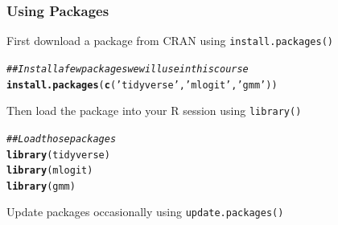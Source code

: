 \documentclass{beamer}\usepackage[]{graphicx}\usepackage[]{color}
\makeatletter
\newcommand{\hlstr}[1]{\textcolor[rgb]{0.192,0.494,0.8}{#1}}%
\newcommand{\hlcom}[1]{\textcolor[rgb]{0.678,0.584,0.686}{\textit{#1}}}%
\newcommand{\hlstd}[1]{\textcolor[rgb]{0.345,0.345,0.345}{#1}}%
\newcommand{\hlkwd}[1]{\textcolor[rgb]{0.737,0.353,0.396}{\textbf{#1}}}%
\newenvironment{kframe}{%
 \def\at@end@of@kframe{}%
 \ifinner\ifhmode%
  \def\at@end@of@kframe{\end{minipage}}%
  \begin{minipage}{\columnwidth}%
 \fi\fi%
 \def\FrameCommand##1{\hskip\@totalleftmargin \hskip-\fboxsep
 \colorbox{shadecolor}{##1}\hskip-\fboxsep
     \hskip-\linewidth \hskip-\@totalleftmargin \hskip\columnwidth}%
 \MakeFramed {\advance\hsize-\width
   \@totalleftmargin\z@ \linewidth\hsize
   \@setminipage}}%
 {\par\unskip\endMakeFramed%
 \at@end@of@kframe}
\newenvironment{knitrout}{}{} %
\makeatother
\begin{document}
\begin{frame}[fragile]\frametitle{Using Packages}
    First download a package from CRAN using \texttt{install.packages()}
\begin{knitrout}\footnotesize
{}\color{fgcolor}\begin{kframe}
\begin{alltt}
\hlcom{## Install a few packages we will use in this course}
\hlkwd{install.packages}\hlstd{(}\hlkwd{c}\hlstd{(}\hlstr{'tidyverse'}\hlstd{,} \hlstr{'mlogit'}\hlstd{,} \hlstr{'gmm'}\hlstd{))}
\end{alltt}
\end{kframe}
\end{knitrout}
    \vspace{3ex}
    Then load the package into your R session using \texttt{library()}
\begin{knitrout}\footnotesize
{}\color{fgcolor}\begin{kframe}
\begin{alltt}
\hlcom{## Load those packages}
\hlkwd{library}\hlstd{(tidyverse)}
\hlkwd{library}\hlstd{(mlogit)}
\hlkwd{library}\hlstd{(gmm)}
\end{alltt}
\end{kframe}
\end{knitrout}
    \vspace{3ex}
    Update packages occasionally using \texttt{update.packages()}
\end{frame}
\end{document}
